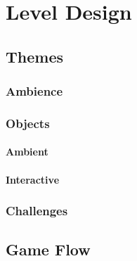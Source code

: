 \section{Level Design}
    \subsection{Themes}
        \subsubsection{Ambience}
        \subsubsection{Objects}
            \paragraph{Ambient}
            \paragraph{Interactive}
        \subsubsection{Challenges}
    \subsection{Game Flow}